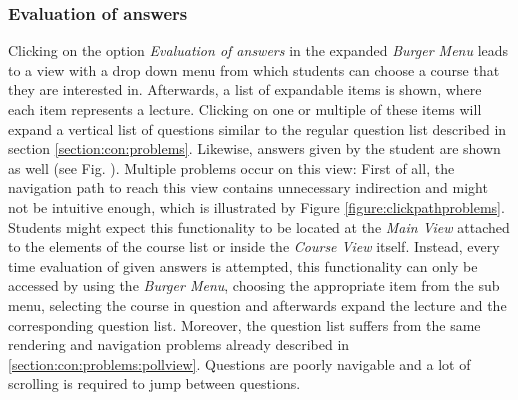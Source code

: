 \subsubsection{Evaluation of answers}

Clicking on the option \emph{Evaluation of answers} in the expanded \emph{Burger Menu} leads to a view with a drop down menu from which students can choose a course that they are interested in. Afterwards, a list of expandable items is shown, where each item represents a lecture. Clicking on one or multiple of these items will expand a vertical list of questions similar to  the regular question list described in section \ref{section:con:problems}. Likewise, answers given by the student are shown as well (see Fig. \todogrf).
Multiple problems occur on this view: First of all, the navigation path to reach this view contains unnecessary indirection and might not be intuitive enough, which is illustrated by Figure \ref{figure:clickpathproblems}. Students might expect this functionality to be located at the \emph{Main View} attached to the elements of the course list or inside the \emph{Course View} itself. Instead, every time evaluation of given answers is attempted, this functionality can only be accessed by using the \emph{Burger Menu}, choosing the appropriate item from the sub menu, selecting the course in question and afterwards expand the lecture and the corresponding question list.
Moreover, the question list suffers from the same rendering and navigation problems already described in \ref{section:con:problems:pollview}. Questions are poorly navigable and a lot of scrolling is required to jump between questions.



